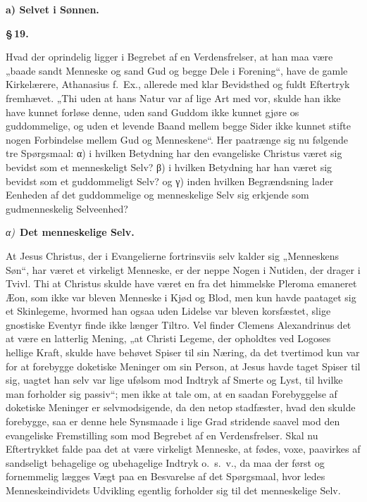 \documentclass[12pt]{book}
\newcommand{\parmark}[1]{\begin{center}{\bfseries \S\,#1.}\end{center}}
\newcommand{\runhead}[1]{%
  \medskip\begin{center}{\bfseries #1}\end{center}\medskip}
\newcommand{\greekrun}[2]{%
  \medskip\begin{center}{\itshape #1)}\ {\bfseries #2}\end{center}\medskip}
\begin{document}
\runhead{a) Selvet i Sønnen.}
\parmark{19}

Hvad der oprindelig ligger i Begrebet af en Verdensfrelser, at han
maa være „baade sandt Menneske og sand Gud og begge Dele i
Forening“, have de gamle Kirkelærere, Athanasius f.\ Ex., allerede
med klar Bevidsthed og fuldt Eftertryk fremhævet. „Thi uden at hans
Natur var af lige Art med vor, skulde han ikke have kunnet forløse
denne, uden sand Guddom ikke kunnet gjøre os guddommelige, og uden
et levende Baand mellem begge
Sider ikke kunnet stifte nogen Forbindelse mellem Gud og
Menneskene“. Her paatrænge sig nu følgende tre Spørgsmaal: α) i
hvilken Betydning har den evangeliske Christus været sig bevidst som
et menneskeligt Selv? β) i hvilken Betydning har han været sig
bevidst som et guddommeligt Selv? og γ) inden hvilken Begrændsning
lader Eenheden af det guddommelige og menneskelige Selv sig erkjende
som gudmenneskelig Selveenhed?

\greekrun{α}{Det menneskelige Selv.}

At Jesus Christus, der i Evangelierne fortrinsviis selv kalder sig
„Menneskens Søn“, har været et virkeligt Menneske, er der neppe
Nogen i Nutiden, der drager i Tvivl. Thi at Christus skulde have
været en fra det himmelske Pleroma emaneret Æon, som ikke var bleven
Menneske i Kjød og Blod, men kun havde paataget sig et Skinlegeme,
hvormed han ogsaa uden Lidelse var bleven korsfæstet, slige
gnostiske Eventyr finde ikke længer Tiltro. Vel finder Clemens
Alexandrinus det at være en latterlig Mening, „at Christi Legeme,
der opholdtes ved Logoses hellige Kraft, skulde have behøvet Spiser
til sin Næring, da det tvertimod kun var for at forebygge doketiske
Meninger om sin Person, at Jesus havde taget Spiser til sig, uagtet
han selv var lige ufølsom mod Indtryk af Smerte og Lyst, til hvilke
man forholder sig passiv“; men ikke at tale om, at en saadan
Forebyggelse af doketiske Meninger er selvmodsigende, da den netop
stadfæster, hvad den skulde forebygge, saa er denne hele Synsmaade i
lige Grad stridende saavel mod den evangeliske Fremstilling som mod
Begrebet af en Verdensfrelser. Skal nu Eftertrykket falde paa det at
være virkeligt Menneske, at fødes, voxe, paavirkes af sandseligt
behagelige og ubehagelige Indtryk o.\ s.\ v., da maa der først og
fornemmelig lægges Vægt paa en Besvarelse af det Spørgsmaal, hvor\-
ledes Menneskeindividets Udvikling egentlig forholder sig til det
menneskelige Selv.
\end{document}
